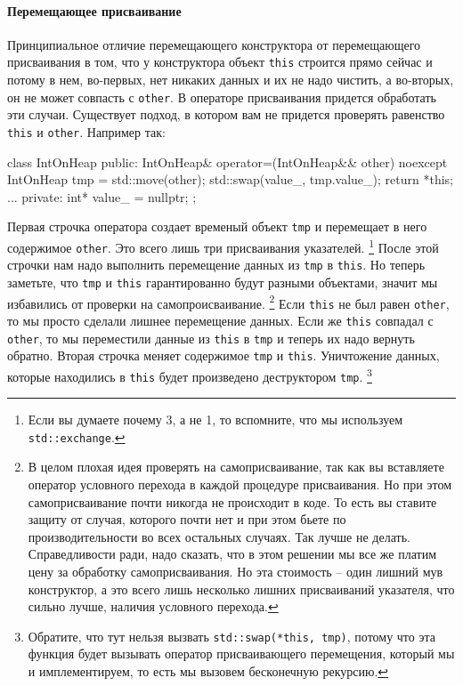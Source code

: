 \paragraph{Перемещающее присваивание}

Принципиальное отличие перемещающего конструктора от перемещающего присваивания в том, что у конструктора объект \verb"this" строится прямо сейчас и потому в нем, во-первых, нет никаких данных и их не надо чистить, а во-вторых, он не может совпасть с \verb"other".
В операторе присваивания придется обработать эти случаи.
Существует подход, в котором вам не придется проверять равенство \verb"this" и \verb"other".
Например так:
\begin{cppcode}
class IntOnHeap {
public:
  IntOnHeap& operator=(IntOnHeap&& other) noexcept {
    IntOnHeap tmp = std::move(other);
    std::swap(value_, tmp.value_);
    return *this;
  }
  ...
private:
  int* value_ = nullptr;
};
\end{cppcode}
Первая строчка оператора создает временый объект \verb"tmp" и перемещает в него содержимое \verb"other".
Это всего лишь три присваивания указателей.%
\footnote{Если вы думаете почему 3, а не 1, то вспомните, что мы используем \verb"std::exchange".}
После этой строчки нам надо выполнить перемещение данных из \verb"tmp" в \verb"this".
Но теперь заметьте, что \verb"tmp" и \verb"this" гарантированно будут разными объектами, значит мы избавились от проверки на самопроисваивание.%
\footnote{В целом плохая идея проверять на самоприсваивание, так как вы вставляете оператор условного перехода в каждой процедуре присваивания.
Но при этом самоприсваивание почти никогда не происходит в коде.
То есть вы ставите защиту от случая, которого почти нет и при этом бьете по производительности во всех остальных случаях.
Так лучше не делать.
Справедливости ради, надо сказать, что в этом решении мы все же платим цену за обработку самоприсваивания.
Но эта стоимость -- один лишний мув конструктор, а это всего лишь несколько лишних присваиваний указателя, что сильно лучше, наличия условного перехода.}
Если \verb"this" не был равен \verb"other", то мы просто сделали лишнее перемещение данных.
Если же \verb"this" совпадал с \verb"other", то мы переместили данные из \verb"this" в \verb"tmp" и теперь их надо вернуть обратно.
Вторая строчка меняет содержимое \verb"tmp" и \verb"this".
Уничтожение данных, которые находились в \verb"this" будет произведено деструктором \verb"tmp".%
\footnote{Обратите, что тут нельзя вызвать \verb"std::swap(*this, tmp)", потому что эта функция будет вызывать оператор присваивающего перемещения, который мы и имплементируем, то есть мы вызовем бесконечную рекурсию.}

